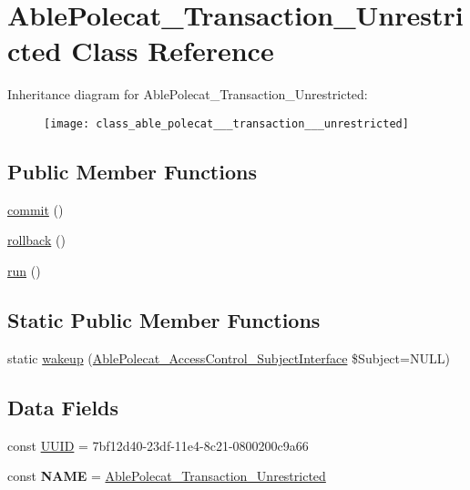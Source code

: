 \hypertarget{class_able_polecat___transaction___unrestricted}{}\section{Able\+Polecat\+\_\+\+Transaction\+\_\+\+Unrestricted Class Reference}
\label{class_able_polecat___transaction___unrestricted}
Inheritance diagram for Able\+Polecat\+\_\+\+Transaction\+\_\+\+Unrestricted\+:\begin{figure}[H]
\begin{center}
\leavevmode
\texttt{[image: class\_able\_polecat\_\_\_transaction\_\_\_unrestricted]}
\end{center}
\end{figure}
\subsection*{Public Member Functions}
\begin{DoxyCompactItemize}
\item 
\hyperlink{class_able_polecat___transaction___unrestricted_af5674c27d4a92f6228565010eacbb9cb}{commit} ()
\item 
\hyperlink{class_able_polecat___transaction___unrestricted_afa549adf79e3f8c09fe8f903dd5fbfa7}{rollback} ()
\item 
\hyperlink{class_able_polecat___transaction___unrestricted_afb0fafe7e02a3ae1993c01c19fad2bae}{run} ()
\end{DoxyCompactItemize}
\subsection*{Static Public Member Functions}
\begin{DoxyCompactItemize}
\item 
static \hyperlink{class_able_polecat___transaction___unrestricted_a3f2135f6ad45f51d075657f6d20db2cd}{wakeup} (\hyperlink{interface_able_polecat___access_control___subject_interface}{Able\+Polecat\+\_\+\+Access\+Control\+\_\+\+Subject\+Interface} \$Subject=N\+U\+L\+L)
\end{DoxyCompactItemize}
\subsection*{Data Fields}
\begin{DoxyCompactItemize}
\item 
const \hyperlink{class_able_polecat___transaction___unrestricted_a74b892c8c0b86bf9d04c5819898c51e7}{U\+U\+I\+D} = \textquotesingle{}7bf12d40-\/23df-\/11e4-\/8c21-\/0800200c9a66\textquotesingle{}
\item 
\hypertarget{class_able_polecat___transaction___unrestricted_a244352f035b82b20b0efa506167fd862}{}const {\bfseries N\+A\+M\+E} = \textquotesingle{}\hyperlink{class_able_polecat___transaction___unrestricted}{Able\+Polecat\+\_\+\+Transaction\+\_\+\+Unrestricted}\textquotesingle{}\label{class_able_polecat___transaction___unrestricted_a244352f035b82b20b0efa506167fd862}

\end{DoxyCompactItemize}
